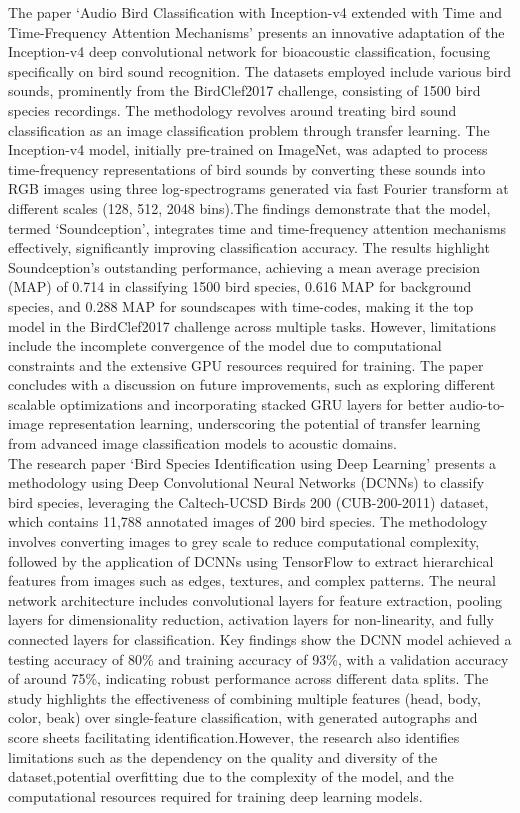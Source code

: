 The paper `Audio Bird Classification with Inception-v4 extended with Time and
Time-Frequency Attention Mechanisms' presents an innovative adaptation of the
Inception-v4 deep convolutional network for bioacoustic classification,
focusing specifically on bird sound recognition. The datasets employed include
various bird sounds, prominently from the BirdClef2017 challenge, consisting of
1500 bird species recordings. The methodology revolves around treating bird
sound classification as an image classification problem through transfer
learning. The Inception-v4 model, initially pre-trained on ImageNet, was
adapted to process time-frequency representations of bird sounds by converting
these sounds into RGB images using three log-spectrograms generated via fast
Fourier transform at different scales (128, 512, 2048 bins).The findings demonstrate that the model,
termed `Soundception', integrates time and time-frequency attention mechanisms
effectively, significantly improving classification accuracy. The results
highlight Soundception's outstanding performance, achieving a mean average
precision (MAP) of 0.714 in classifying 1500 bird species, 0.616 MAP for
background species, and 0.288 MAP for soundscapes with time-codes, making it
the top model in the BirdClef2017 challenge across multiple tasks. However,
limitations include the incomplete convergence of the model due to
computational constraints and the extensive GPU resources required for
training. The paper concludes with a discussion on future
improvements, such as exploring different scalable optimizations and
incorporating stacked GRU layers for better audio-to-image representation
learning, underscoring the potential of transfer learning from advanced image
classification models to acoustic domains.\cite{sevilla2017audio}\\

The research paper `Bird Species Identification using Deep Learning' presents a
methodology using Deep Convolutional Neural Networks (DCNNs) to classify bird
species, leveraging the Caltech-UCSD Birds 200 (CUB-200-2011) dataset, which
contains 11,788 annotated images of 200 bird species. The methodology involves
converting images to grey scale to reduce computational complexity, followed by
the application of DCNNs using TensorFlow to extract hierarchical features from
images such as edges, textures, and complex patterns. The neural network
architecture includes convolutional layers for feature extraction, pooling
layers for dimensionality reduction, activation layers for non-linearity, and
fully connected layers for classification. Key findings show the DCNN model
achieved a testing accuracy of 80\% and training accuracy of 93\%, with a
validation accuracy of around 75\%, indicating robust performance across
different data splits. The study highlights the effectiveness of combining
multiple features (head, body, color, beak) over single-feature classification,
with generated autographs and score sheets facilitating identification.However,
the research also identifies limitations such as the dependency on the quality 
and diversity of the dataset,potential overfitting due to the complexity of the
model, and the computational resources required for training deep learning models\cite{Gavali2019Bird}.\\

